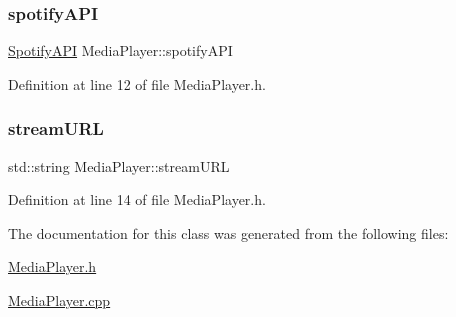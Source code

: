 \subsubsection{\texorpdfstring{spotify\+A\+PI}{spotifyAPI}}
{\footnotesize\ttfamily \mbox{\hyperlink{class_spotify_a_p_i}{Spotify\+A\+PI}} Media\+Player\+::spotify\+A\+PI\hspace{0.3cm}{\ttfamily [private]}}



Definition at line 12 of file Media\+Player.\+h.

\mbox{\label{class_media_player_ae236af5daf2a13066c3f21c4b4137ade}} 
\subsubsection{\texorpdfstring{stream\+U\+RL}{streamURL}}
{\footnotesize\ttfamily std\+::string Media\+Player\+::stream\+U\+RL\hspace{0.3cm}{\ttfamily [private]}}



Definition at line 14 of file Media\+Player.\+h.



The documentation for this class was generated from the following files\+:\begin{DoxyCompactItemize}
\item 
\mbox{\hyperlink{_media_player_8h}{Media\+Player.\+h}}\item 
\mbox{\hyperlink{_media_player_8cpp}{Media\+Player.\+cpp}}\end{DoxyCompactItemize}
